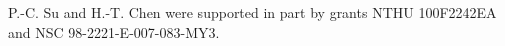 \documentclass[conference]{IEEEtran}
\begin{document}
{
\vspace{0.5cm}
 P.-C. Su and H.-T. Chen were supported in part by grants NTHU 100F2242EA and NSC 98-2221-E-007-083-MY3.
}

{
\small


}
\end{document}
